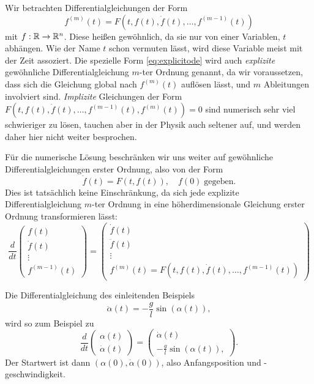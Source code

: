 Wir betrachten Differentialgleichungen der Form
\begin{equation}
  \label{eq:explicitode}
  f^{(m)}(t) = F(t, f(t), \dot f(t), \ldots, f^{(m-1)}(t))
\end{equation}
mit $f:\mathbb{R}\to\mathbb{R}^n$. Diese heißen gewöhnlich, da sie nur von einer
Variablen, $t$ abhängen. Wie der Name $t$ schon vermuten lässt, wird
diese Variable meist mit der Zeit assoziert. Die spezielle Form
\eqref{eq:explicitode} wird auch \emph{explizite} gewöhnliche
Differentialgleichung $m$-ter Ordnung genannt, da wir voraussetzen,
dass sich die Gleichung global nach $f^{(m)}(t)$ auflösen lässt, und
$m$ Ableitungen involviert sind. \emph{Implizite} Gleichungen der Form
$F(t, f(t), \dot f(t), \ldots, f^{(m-1)}(t),f^{(m)}(t)) = 0$ sind
numerisch sehr viel schwieriger zu lösen, tauchen aber in der Physik
auch seltener auf, und werden daher hier nicht weiter besprochen.

Für die numerische Lösung beschränken wir uns weiter auf gewöhnliche
Differentialgleichungen erster Ordnung, also von der Form
\begin{equation}
  \label{eq:1storderode}
  \dot f(t) = F(t, f(t)),\quad f(0)\;\text{gegeben}.
\end{equation}
Dies ist tatsächlich keine Einschränkung, da sich jede explizite
Differentialgleichung $m$-ter Ordnung in eine höherdimensionale
Gleichung erster Ordnung transformieren lässt:
\begin{equation}
  \frac{d}{dt}\begin{pmatrix}
    f(t)\\
    \dot f(t)\\
    \vdots\\
    f^{(m-1)}(t)
  \end{pmatrix}
  =
  \begin{pmatrix}
    \dot f(t)\\
    \ddot f(t)\\
    \vdots\\
    f^{(m)}(t) = F(t, f(t), \dot f(t), \ldots, f^{(m-1)}(t))
  \end{pmatrix}
\end{equation}

Die Differentialgleichung des einleitenden Beispiels
\begin{equation}
  \label{eq:fadenpendel2}
  \ddot \alpha(t) = -\frac{g}{l}\sin(\alpha(t)),
\end{equation}
wird so zum Beispiel zu
\begin{equation}
  \frac{d}{dt}\begin{pmatrix}
    \alpha(t)\\
    \dot \alpha(t)
  \end{pmatrix}
  =
  \begin{pmatrix}
    \dot \alpha(t)\\
    -\frac{g}{l}\sin(\alpha(t)),
  \end{pmatrix}.
\end{equation}  
Der Startwert ist dann $(\alpha(0), \dot \alpha(0))$, also
Anfangsposition und -geschwindigkeit.

